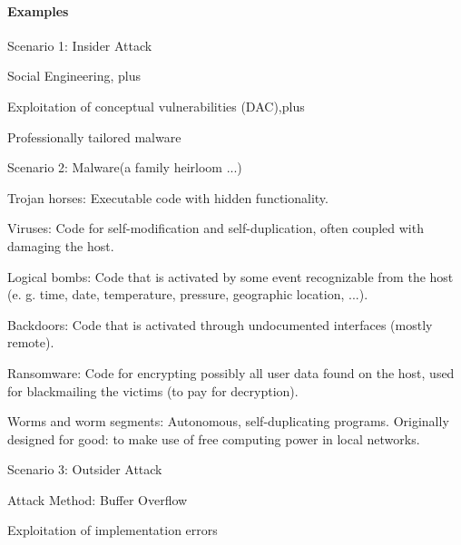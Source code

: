 \documentclass[a4paper]{article}
\begin{document}
\begin{multicols}{3}
    \paragraph{Examples}
    Scenario 1: Insider Attack
    \begin{itemize*}
        \item Social Engineering, plus
        \item Exploitation of conceptual vulnerabilities (DAC),plus
        \item Professionally tailored malware
    \end{itemize*}

    Scenario 2: Malware(a family heirloom ...)
    \begin{itemize*}
        \item Trojan horses: Executable code with hidden functionality.
        \item Viruses: Code for self-modification and self-duplication, often coupled with damaging the host.
        \item Logical bombs: Code that is activated by some event recognizable from the host (e. g. time, date, temperature, pressure, geographic location, ...).
        \item Backdoors: Code that is activated through undocumented interfaces (mostly remote).
        \item Ransomware: Code for encrypting possibly all user data found on the host, used for blackmailing the victims (to pay for decryption).
        \item Worms and worm segments: Autonomous, self-duplicating programs. Originally designed for good: to make use of free computing power in local networks.
    \end{itemize*}

    Scenario 3: Outsider Attack
    \begin{itemize*}
        \item Attack Method: Buffer Overflow
        \item Exploitation of implementation errors
    \end{itemize*}


\end{multicols}
\end{document}
